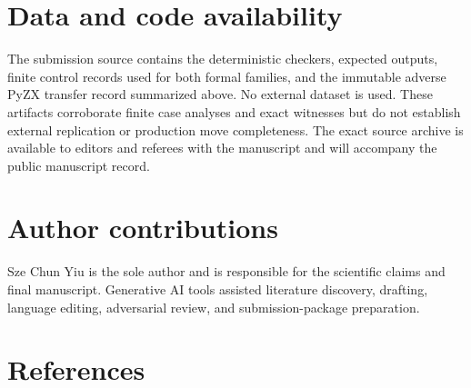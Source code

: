 \documentclass[11pt]{article}
\begin{document}
\section*{Data and code availability}\label{data-and-code-availability}

The submission source contains the deterministic checkers, expected outputs, finite control records used for both formal families, and the immutable adverse PyZX transfer record summarized above. No external dataset is used. These artifacts corroborate finite case analyses and exact witnesses but do not establish external replication or production move completeness. The exact source archive is available to editors and referees with the manuscript and will accompany the public manuscript record.

\section*{Author contributions}\label{author-contributions}

Sze Chun Yiu is the sole author and is responsible for the scientific claims and final manuscript. Generative AI tools assisted literature discovery, drafting, language editing, adversarial review, and submission-package preparation.

\section*{References}\label{references}
\end{document}
